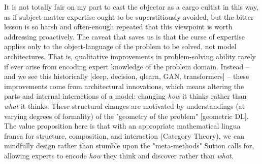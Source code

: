 It is not totally fair on my part to cast the objector as a cargo cultist in this way, as if subject-matter expertise ought to be superstitiously avoided, but the bitter lesson is so harsh and often-enough repeated that this viewpoint is worth addressing proactively. The caveat that saves us is that the curse of expertise applies only to the object-language of the problem to be solved, not model architectures. That is, qualitative improvements in problem-solving ability rarely if ever arise from encoding expert knowledge of the problem domain. Instead -- and we see this historically [deep, decision, qlearn, GAN, transformers] -- these improvements come from architectural innovations, which means altering the parts and internal interactions of a model: changing \emph{how} it thinks rather than \emph{what} it thinks. These structural changes are motivated by understandings (at varying degrees of formality) of the "geometry of the problem" [geometric DL]. The value proposition here is that with an appropriate mathematical lingua franca for structure, composition, and interaction (Category Theory), we can mindfully design rather than stumble upon the "meta-methods" Sutton calls for, allowing experts to encode \emph{how} they think and discover rather than \emph{what}.\\

